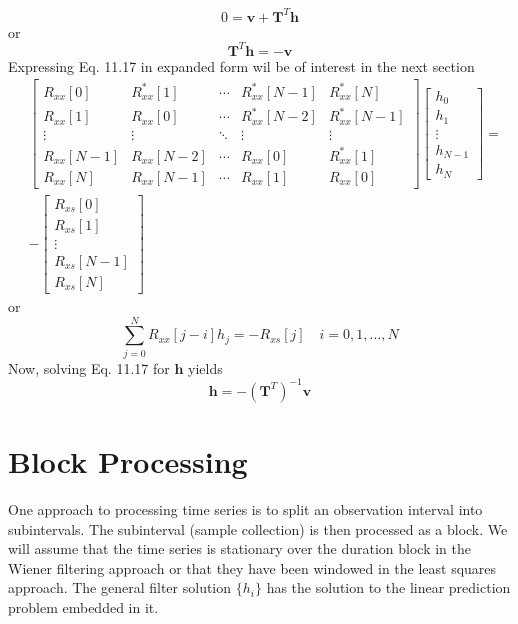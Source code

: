 \documentclass[11pt]{report}
\theoremstyle{example}
\begin{document}
\begin{equation}
	0=\mathbf{v}+\mathbf{T}^T\mathbf{h}
\end{equation}
or
\begin{equation}
	\mathbf{T}^T\mathbf{h}=-\mathbf{v}
\end{equation}
Expressing Eq. 11.17 in expanded form wil be of interest in the next section
\begin{equation}
	\begin{split}
		&\begin{bmatrix}
			R_{xx}[0] & R_{xx}^*[1] & \cdots&R_{xx}^*[N-1]&R_{xx}^*[N]\\
			R_{xx}[1] & R_{xx}[0] & \cdots & R_{xx}^*[N-2] & R_{xx}^*[N-1]\\
			\vdots & \vdots & \ddots & \vdots & \vdots\\
			R_{xx}[N-1] & R_{xx}[N-2] & \cdots & R_{xx}[0] & R_{xx}^*[1]\\
			R_{xx}[N] & R_{xx}[N-1] & \cdots & R_{xx}[1] & R_{xx}[0]
		\end{bmatrix}
		\begin{bmatrix}
			h_0\\
			h_1\\
			\vdots\\
			h_{N-1}\\
			h_N
		\end{bmatrix}=\\
		&-
		\begin{bmatrix}
			R_{xs}[0]\\
			R_{xs}[1]\\
			\vdots\\
			R_{xs}[N-1]\\
			R_{xs}[N]
		\end{bmatrix}
	\end{split}
\end{equation}
or
\begin{equation}
	\sum_{j=0}^N{R_{xx}[j-i]h_j}=-R_{xs}[j]\quad{i=0,1,\ldots,N}
\end{equation}
Now, solving Eq. 11.17 for $\mathbf{h}$ yields
\begin{equation}
	\mathbf{h}=-(\mathbf{T}^T)^{-1}\mathbf{v}
\end{equation}

\section{Block Processing}
One approach to processing time series is to split an observation interval into subintervals. The subinterval (sample collection) is then processed as a block. We will assume that the time series is stationary over the duration block in the Wiener filtering approach or that they have been windowed in the least squares approach. The general filter solution $\{h_i\}$ has the solution to the linear prediction problem embedded in it.
\end{document}
